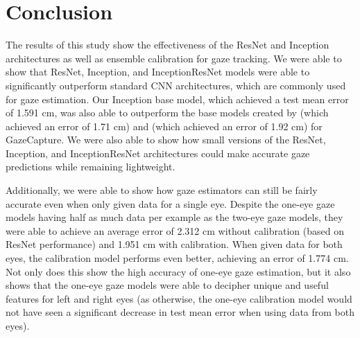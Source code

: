 \documentclass{article}
\begin{document}
\section{Conclusion}

The results of this study show the effectiveness of the ResNet and Inception architectures as well as ensemble calibration for gaze tracking. We were able to show that ResNet, Inception, and InceptionResNet models were able to significantly outperform standard CNN architectures, which are commonly used for gaze estimation. Our Inception base model, which achieved a test mean error of 1.591 cm, was also able to outperform the base models created by \cite{mitpaper} (which achieved an error of 1.71 cm) and \cite{googlepaper} (which achieved an error of 1.92 cm) for GazeCapture. We were also able to show how small versions of the ResNet, Inception, and InceptionResNet architectures could make accurate gaze predictions while remaining lightweight.

Additionally, we were able to show how gaze estimators can still be fairly accurate even when only given data for a single eye. Despite the one-eye gaze models having half as much data per example as the two-eye gaze models, they were able to achieve an average error of 2.312 cm without calibration (based on ResNet performance) and 1.951 cm with calibration. When given data for both eyes, the calibration model performs even better, achieving an error of 1.774 cm. Not only does this show the high accuracy of one-eye gaze estimation, but it also shows that the one-eye gaze models were able to decipher unique and useful features for left and right eyes (as otherwise, the one-eye calibration model would not have seen a significant decrease in test mean error when using data from both eyes).
\end{document}
